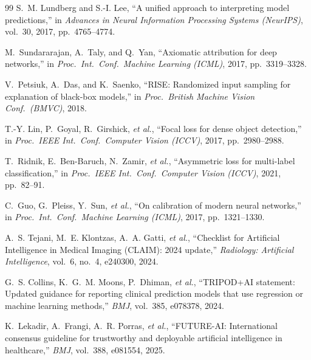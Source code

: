 \documentclass[11pt]{IEEEtran}
\begin{document}
\begin{thebibliography}{99}
 S.~M. Lundberg and S.-I. Lee, ``A unified approach to interpreting model
predictions,'' in \emph{Advances in Neural Information Processing Systems (NeurIPS)}, vol.~30,
2017, pp.~4765--4774.

 M.~Sundararajan, A.~Taly, and Q.~Yan, ``Axiomatic attribution for deep
networks,'' in \emph{Proc.\ Int.\ Conf.\ Machine Learning (ICML)}, 2017, pp.~3319--3328.

 V.~Petsiuk, A.~Das, and K.~Saenko, ``RISE: Randomized input sampling for
explanation of black-box models,'' in \emph{Proc.\ British Machine Vision Conf.\ (BMVC)}, 2018.

 T.-Y. Lin, P.~Goyal, R.~Girshick, \emph{et al.}, ``Focal loss for
dense object detection,'' in \emph{Proc.\ IEEE Int.\ Conf.\ Computer Vision (ICCV)}, 2017,
pp.~2980--2988.

 T.~Ridnik, E.~Ben-Baruch, N.~Zamir, \emph{et al.}, ``Asymmetric loss for multi-label classification,'' in \emph{Proc.\ IEEE Int.\
Conf.\ Computer Vision (ICCV)}, 2021, pp.~82--91.

 C.~Guo, G.~Pleiss, Y.~Sun, \emph{et al.}, ``On calibration of modern
neural networks,'' in \emph{Proc.\ Int.\ Conf.\ Machine Learning (ICML)}, 2017, pp.~1321--1330.

 A.~S. Tejani, M.~E. Klontzas, A.~A. Gatti, \emph{et al.}, ``Checklist for Artificial Intelligence in Medical Imaging (CLAIM): 2024
update,'' \emph{Radiology: Artificial Intelligence}, vol.~6, no.~4, e240300, 2024.

 G.~S. Collins, K.~G.~M. Moons, P.~Dhiman, \emph{et al.}, ``TRIPOD+AI statement: Updated guidance for reporting clinical
prediction models that use regression or machine learning methods,'' \emph{BMJ}, vol.~385,
e078378, 2024.

 K.~Lekadir, A.~Frangi, A.~R. Porras, \emph{et al.}, ``FUTURE-AI: International consensus guideline for trustworthy and
deployable artificial intelligence in healthcare,'' \emph{BMJ}, vol.~388, e081554, 2025.

\end{thebibliography}
\end{document}
